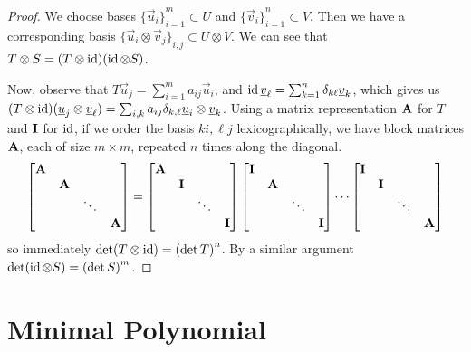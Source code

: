 \begin{proof}
    We choose bases \({\{\vec{u}_i\}}_{i=1}^m \subset U\)
    and \({\{\vec{v}_i\}}_{i=1}^n \subset V\).
    Then we have a corresponding basis \({\{\vec{u}_i\otimes\vec{v}_j\}}_{i,j} \subset U \otimes V\).
    We can see that \(T \otimes S = (T \otimes \operatorname{id})(\operatorname{id} \otimes S)\).

    Now, observe that \(T\vec{u}_j = \sum_{i=1}^m a_{ij}\vec{u}_i\),
    and \(\operatorname{id}\underline{v}_\ell = \sum_{k=1}^n \delta_{k\ell}\underline{v}_k\),
    which gives us \((T \otimes \operatorname{id})(\underline{u}_j\otimes\underline{v}_\ell)
    = \sum_{i,k} a_{ij}\delta_{k,\ell} \underline{u}_i\otimes\underline{v}_k\).
    Using a matrix representation \(\vb{A}\) for \(T\) and \(\vb{I}\) for \(\operatorname{id}\),
    if we order the basis \(ki, \ell j\) lexicographically,
    we have block matrices \(\vb{A}\), each of size \(m \times m\), repeated \(n\) times along the diagonal.
    \begin{equation*}
        \bmqty{\vb{A} \\ & \vb{A} \\ && \ddots \\ &&& \vb{A}}
        = \bmqty{\vb{A} \\ & \vb{I} \\ && \ddots \\ &&& \vb{I}}
        \bmqty{\vb{I} \\ & \vb{A} \\ && \ddots \\ &&& \vb{I}} \cdots
        \bmqty{\vb{I} \\ & \vb{I} \\ && \ddots \\ &&& \vb{A}}
    \end{equation*}
    so immediately \(\det(T \otimes \id) = \pqty{\det T}^n\).
    By a similar argument \(\det(\id \otimes S) = \pqty{\det S}^m\).
\end{proof}


\section{Minimal Polynomial}

